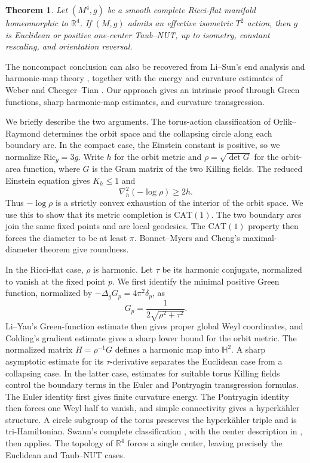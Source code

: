\documentclass[letterpaper]{amsart}
\newtheorem{thm}{Theorem}[section]
\theoremstyle{definition}
\theoremstyle{remark}
\begin{document}
\begin{thm}\label{notes-R4-classification}
Let $(M^4,g)$ be a smooth complete Ricci-flat manifold homeomorphic to
$\mathbb R^4$. If $(M,g)$ admits an effective isometric $T^2$ action, then
$g$ is Euclidean or positive one-center Taub--NUT, up to isometry,
constant rescaling, and orientation reversal.
\end{thm}

The noncompact conclusion can also be recovered from Li--Sun's end
analysis and harmonic-map theory \cite{notes-LiSunCompact,notes-LiSunHarmonic},
together with the energy and curvature estimates of Weber
\cite{notes-Weber} and Cheeger--Tian \cite{notes-CheegerTian}.
Our approach gives an intrinsic proof through Green functions, sharp
harmonic-map estimates, and curvature transgression.

We briefly describe the two arguments. The torus-action classification
of Orlik--Raymond \cite{notes-OrlikRaymond} determines the orbit space
and the collapsing circle along each boundary arc. In the compact case,
the Einstein constant is positive, so we normalize
$\mathrm{Ric}_g=3g$. Write $h$ for the orbit metric and
$\rho=\sqrt{\det G}$ for the orbit-area function, where $G$ is the Gram
matrix of the two Killing fields. The reduced Einstein equation gives
$K_h\leq1$ and
\[
 \nabla_h^2(-\log\rho)\geq2h.
\]
Thus $-\log\rho$ is a strictly convex exhaustion of the interior of the
orbit space. We use this to show that its metric completion is
$\mathrm{CAT}(1)$. The two boundary arcs join the same fixed points and
are local geodesics. The $\mathrm{CAT}(1)$ property then forces the
diameter to be at least $\pi$. Bonnet--Myers and Cheng's maximal-diameter
theorem \cite{notes-Cheng} give roundness.

In the Ricci-flat case, $\rho$ is harmonic. Let $\tau$ be its harmonic
conjugate, normalized to vanish at the fixed point $p$. We first identify
the minimal positive Green function, normalized by
$-\Delta_g G_p=4\pi^2\delta_p$, as
\[
 G_p=\frac{1}{2\sqrt{\rho^2+\tau^2}}.
\]
Li--Yau's Green-function estimate \cite{notes-LiYau} then gives proper
global Weyl coordinates, and Colding's gradient estimate
\cite{notes-Colding} gives a sharp lower bound for the orbit metric.
The normalized matrix $H=\rho^{-1}G$ defines a harmonic map into
$\mathbb H^2$. A sharp asymptotic estimate for its $\tau$-derivative separates the
Euclidean case from a collapsing case. In the latter case, estimates for
suitable torus Killing fields control the boundary terms in the Euler
and Pontryagin transgression formulas. The Euler identity first gives
finite curvature energy. The Pontryagin identity then forces one Weyl
half to vanish, and simple connectivity gives a hyperk\"ahler structure.
A circle subgroup of the torus preserves the hyperk\"ahler triple and is
tri-Hamiltonian. Swann's complete classification
\cite[Theorem~3.1]{notes-Swann}, with the center description in
\cite[Section~2.2]{notes-DancerSwann}, then applies. The topology of
$\mathbb R^4$ forces a single center, leaving precisely the Euclidean
and Taub--NUT cases.
\end{document}
